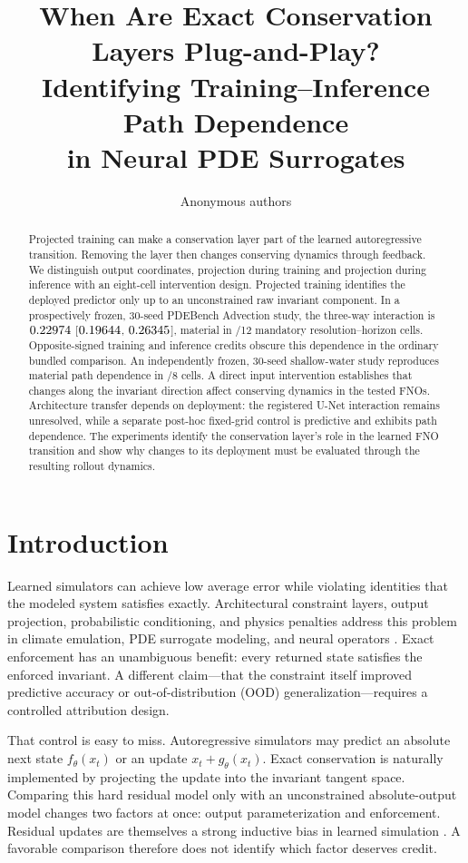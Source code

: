 \documentclass{article}
\title{When Are Exact Conservation Layers Plug-and-Play?\\
Identifying Training--Inference Path Dependence\\
in Neural PDE Surrogates}
\author{Anonymous authors}
\begin{document}
\maketitle

\begin{abstract}
Projected training can make a conservation layer part of the learned autoregressive transition.
Removing the layer then changes conserving dynamics through feedback. We distinguish output
coordinates, projection during training and projection during inference with an eight-cell
intervention design. Projected training identifies the deployed predictor only up to an
unconstrained raw invariant component. In a prospectively frozen, 30-seed PDEBench Advection
study, the three-way interaction is $0.22974$ [$0.19644$, $0.26345$], material in
\CubeMaterialCells/12 mandatory resolution--horizon cells. Opposite-signed training and inference
credits obscure this dependence in the ordinary bundled comparison. An independently frozen,
30-seed shallow-water study reproduces material path dependence in \SWEMaterialCells/8 cells.
A direct input intervention establishes that changes along the invariant direction affect
conserving dynamics in the tested FNOs. Architecture transfer depends on deployment: the
registered U-Net interaction remains unresolved, while a separate post-hoc fixed-grid control
is predictive and exhibits path dependence. The experiments identify the conservation layer's
role in the learned FNO transition and show why changes to its deployment must be evaluated
through the resulting rollout dynamics.
\end{abstract}

\section{Introduction}

Learned simulators can achieve low average error while violating identities that the modeled
system satisfies exactly. Architectural constraint layers, output projection, probabilistic
conditioning, and physics penalties address this problem in climate emulation, PDE surrogate
modeling, and neural operators \citep{beucler2021,hansen2023,harder2023,liu2024clawno}. Exact
enforcement has an unambiguous benefit: every returned state satisfies the enforced invariant. A
different claim---that the constraint itself improved predictive accuracy or out-of-distribution
(OOD) generalization---requires a controlled attribution design.

That control is easy to miss. Autoregressive simulators may predict an absolute next state
$f_\theta(x_t)$ or an update $x_t+g_\theta(x_t)$. Exact conservation is naturally implemented by
projecting the update into the invariant tangent space. Comparing this hard residual model only
with an unconstrained absolute-output model changes two factors at once: output parameterization
and enforcement. Residual updates are themselves a strong inductive bias in learned simulation
\citep{pfaff2021}. A favorable comparison therefore does not identify which factor deserves
credit.
\end{document}
